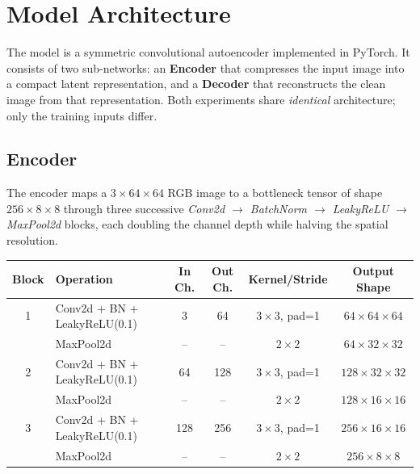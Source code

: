 \documentclass[12pt,a4paper]{article}
\begin{document}
\newpage
\section{Model Architecture}

The model is a symmetric convolutional autoencoder implemented in PyTorch. It
consists of two sub-networks: an \textbf{Encoder} that compresses the input
image into a compact latent representation, and a \textbf{Decoder} that
reconstructs the clean image from that representation. Both experiments share
\emph{identical} architecture; only the training inputs differ.

\subsection{Encoder}

The encoder maps a $3 \times 64 \times 64$ RGB image to a bottleneck tensor
of shape $256 \times 8 \times 8$ through three successive
\textit{Conv2d $\to$ BatchNorm $\to$ LeakyReLU $\to$ MaxPool2d} blocks,
each doubling the channel depth while halving the spatial resolution.

\vspace{4pt}
\renewcommand{\arraystretch}{1.35}
\begin{center}
\begin{tabular}{clcccc}
\toprule
\textbf{Block} & \textbf{Operation} & \textbf{In Ch.} & \textbf{Out Ch.}
               & \textbf{Kernel/Stride} & \textbf{Output Shape} \\
\midrule
1 & Conv2d + BN + LeakyReLU(0.1) & 3   & 64  & $3\times3$, pad=1 & $64\times64\times64$ \\
  & MaxPool2d                    & --  & --  & $2\times2$        & $64\times32\times32$ \\
\midrule
2 & Conv2d + BN + LeakyReLU(0.1) & 64  & 128 & $3\times3$, pad=1 & $128\times32\times32$ \\
  & MaxPool2d                    & --  & --  & $2\times2$        & $128\times16\times16$ \\
\midrule
3 & Conv2d + BN + LeakyReLU(0.1) & 128 & 256 & $3\times3$, pad=1 & $256\times16\times16$ \\
  & MaxPool2d                    & --  & --  & $2\times2$        & $256\times8\times8$ \\
\bottomrule
\end{tabular}
\end{center}
\end{document}
